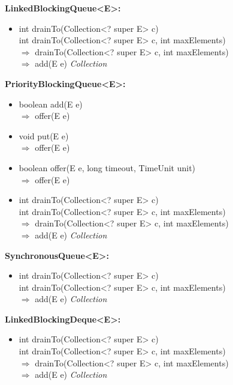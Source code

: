 \documentclass[]{usiinfthesis}
\begin{document}
{\noindent
\textbf{LinkedBlockingQueue<E>:}
\begin{itemize}
    \item   int drainTo(Collection<? super E> c)
    \mbox{}\\   int drainTo(Collection<? super E> c, int maxElements)
    \mbox{}\\ $\Rightarrow$ drainTo(Collection<? super E> c, int maxElements)
    \mbox{}\\ $\Rightarrow$ add(E e)		\textit{Collection}
\end{itemize}

\noindent
\textbf{PriorityBlockingQueue<E>:}
\begin{itemize}
    \item   boolean add(E e)
    \mbox{}\\ $\Rightarrow$   offer(E e)
    \item   void put(E e) 
    \mbox{}\\ $\Rightarrow$   offer(E e)
    \item   boolean offer(E e, long timeout, TimeUnit unit)
    \mbox{}\\ $\Rightarrow$   offer(E e)	
    \item   int drainTo(Collection<? super E> c)
    \mbox{}\\   int drainTo(Collection<? super E> c, int maxElements)
    \mbox{}\\ $\Rightarrow$   drainTo(Collection<? super E> c, int maxElements)
    \mbox{}\\ $\Rightarrow$   add(E e)		\textit{Collection}
\end{itemize}

\noindent
\textbf{SynchronousQueue<E>:}
\begin{itemize}
    \item   int drainTo(Collection<? super E> c)
    \mbox{}\\   int drainTo(Collection<? super E> c, int maxElements)
    \mbox{}\\ $\Rightarrow$   add(E e)		\textit{Collection}
\end{itemize}


\noindent
\textbf{LinkedBlockingDeque<E>:}
\begin{itemize}
    \item   int drainTo(Collection<? super E> c)
    \mbox{}\\   int drainTo(Collection<? super E> c, int maxElements)
    \mbox{}\\ $\Rightarrow$ drainTo(Collection<? super E> c, int maxElements)
    \mbox{}\\ $\Rightarrow$ add(E e)		\textit{Collection}
\end{itemize}

}
\end{document}

